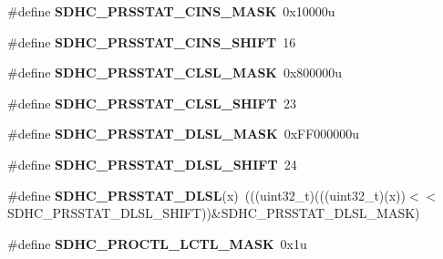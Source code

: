 \begin{DoxyCompactItemize}
\item 
\#define {\bfseries S\+D\+H\+C\+\_\+\+P\+R\+S\+S\+T\+A\+T\+\_\+\+C\+I\+N\+S\+\_\+\+M\+A\+SK}~0x10000u\hypertarget{group__SDHC__Register__Masks_ga48dc8b20e5092e223a378a1cba4803d1}{}\label{group__SDHC__Register__Masks_ga48dc8b20e5092e223a378a1cba4803d1}

\item 
\#define {\bfseries S\+D\+H\+C\+\_\+\+P\+R\+S\+S\+T\+A\+T\+\_\+\+C\+I\+N\+S\+\_\+\+S\+H\+I\+FT}~16\hypertarget{group__SDHC__Register__Masks_ga3aaccd62a11f1cd2f842cd8d5f50ba79}{}\label{group__SDHC__Register__Masks_ga3aaccd62a11f1cd2f842cd8d5f50ba79}

\item 
\#define {\bfseries S\+D\+H\+C\+\_\+\+P\+R\+S\+S\+T\+A\+T\+\_\+\+C\+L\+S\+L\+\_\+\+M\+A\+SK}~0x800000u\hypertarget{group__SDHC__Register__Masks_gab76b324ebb0b2d882ac0f8a1f563647d}{}\label{group__SDHC__Register__Masks_gab76b324ebb0b2d882ac0f8a1f563647d}

\item 
\#define {\bfseries S\+D\+H\+C\+\_\+\+P\+R\+S\+S\+T\+A\+T\+\_\+\+C\+L\+S\+L\+\_\+\+S\+H\+I\+FT}~23\hypertarget{group__SDHC__Register__Masks_ga321c503ac2679cd51a2a30219a33d951}{}\label{group__SDHC__Register__Masks_ga321c503ac2679cd51a2a30219a33d951}

\item 
\#define {\bfseries S\+D\+H\+C\+\_\+\+P\+R\+S\+S\+T\+A\+T\+\_\+\+D\+L\+S\+L\+\_\+\+M\+A\+SK}~0x\+F\+F000000u\hypertarget{group__SDHC__Register__Masks_gacc5e74fd893e00bf8d48d3ad7165de0a}{}\label{group__SDHC__Register__Masks_gacc5e74fd893e00bf8d48d3ad7165de0a}

\item 
\#define {\bfseries S\+D\+H\+C\+\_\+\+P\+R\+S\+S\+T\+A\+T\+\_\+\+D\+L\+S\+L\+\_\+\+S\+H\+I\+FT}~24\hypertarget{group__SDHC__Register__Masks_ga6c5c346e4671cdebd3a2132924f059a1}{}\label{group__SDHC__Register__Masks_ga6c5c346e4671cdebd3a2132924f059a1}

\item 
\#define {\bfseries S\+D\+H\+C\+\_\+\+P\+R\+S\+S\+T\+A\+T\+\_\+\+D\+L\+SL}(x)~(((uint32\+\_\+t)(((uint32\+\_\+t)(x))$<$$<$S\+D\+H\+C\+\_\+\+P\+R\+S\+S\+T\+A\+T\+\_\+\+D\+L\+S\+L\+\_\+\+S\+H\+I\+FT))\&S\+D\+H\+C\+\_\+\+P\+R\+S\+S\+T\+A\+T\+\_\+\+D\+L\+S\+L\+\_\+\+M\+A\+SK)\hypertarget{group__SDHC__Register__Masks_ga8d155771c72f8082c8a3174c8c0aa279}{}\label{group__SDHC__Register__Masks_ga8d155771c72f8082c8a3174c8c0aa279}

\item 
\#define {\bfseries S\+D\+H\+C\+\_\+\+P\+R\+O\+C\+T\+L\+\_\+\+L\+C\+T\+L\+\_\+\+M\+A\+SK}~0x1u\hypertarget{group__SDHC__Register__Masks_ga482b0e558b7376a5e14f47bffdcb33c1}{}\label{group__SDHC__Register__Masks_ga482b0e558b7376a5e14f47bffdcb33c1}


\end{DoxyCompactItemize}
